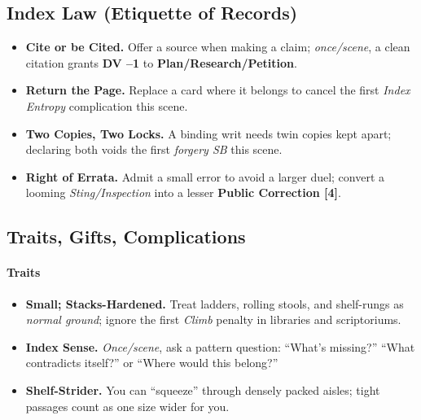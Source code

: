 \documentclass[11pt]{book}
\begin{document}
\subsection*{Index Law (Etiquette of Records)}
\begin{itemize}
    \item \textbf{Cite or be Cited.} Offer a source when making a claim; \emph{once/scene}, a clean citation grants \textbf{DV --1} to \textbf{Plan/Research/Petition}.
    \item \textbf{Return the Page.} Replace a card where it belongs to cancel the first \emph{Index Entropy} complication this scene.
    \item \textbf{Two Copies, Two Locks.} A binding writ needs twin copies kept apart; declaring both voids the first \emph{forgery SB} this scene.
    \item \textbf{Right of Errata.} Admit a small error to avoid a larger duel; convert a looming \emph{Sting/Inspection} into a lesser \textbf{Public Correction [4]}.
\end{itemize}

\subsection*{Traits, Gifts, Complications}
\paragraph{Traits}
\begin{itemize}
    \item \textbf{Small; Stacks-Hardened.} Treat ladders, rolling stools, and shelf-rungs as \emph{normal ground}; ignore the first \emph{Climb} penalty in libraries and scriptoriums.
    \item \textbf{Index Sense.} \emph{Once/scene}, ask a pattern question: ``What's missing?'' ``What contradicts itself?'' or ``Where would this belong?''
    \item \textbf{Shelf-Strider.} You can ``squeeze'' through densely packed aisles; tight passages count as one size wider for you.
\end{itemize}
\end{document}
